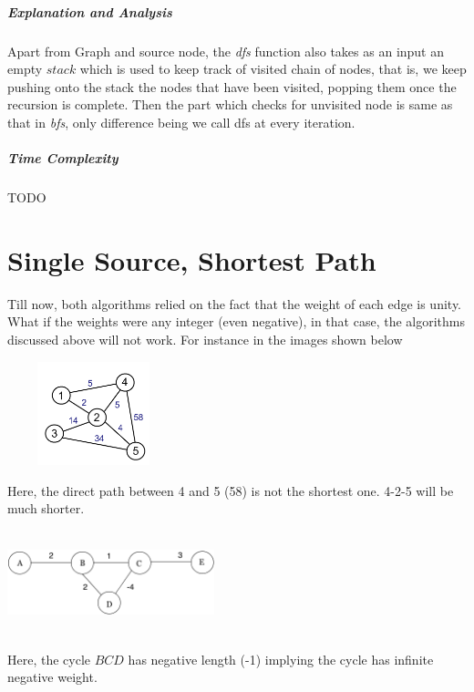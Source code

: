 \documentclass[11pt,a4paper]{extarticle}
\begin{document}
\begin{adjustwidth}{2.5em}{0pt}

\end{adjustwidth}

\subparagraph{Explanation and Analysis}
Apart from Graph and source node, the \textit{dfs} function also takes as an input an empty $stack$ which is used to keep track of visited chain of nodes, that is, we keep pushing onto the stack the nodes that have been visited, popping them once the recursion is complete. Then the part which checks for unvisited node is same as that in \textit{bfs}, only difference being we call dfs at every iteration.

\subparagraph{Time Complexity}
TODO

\section{Single Source, Shortest Path}
Till now, both algorithms relied on the fact that the weight of each edge is unity. What if the weights were any integer (even negative), in that case, the algorithms discussed above will not work. For instance in the images shown below

\begin{multicols}{2}

\begin{center}
	\includegraphics[width=5cm, height=3cm]{shortest}
\end{center}
Here, the direct path between 4 and 5 (58) is not the shortest one. 4-2-5 will be much shorter.

\columnbreak

\begin{center}
	\includegraphics[width=6cm, height=3cm]{negative}
\end{center}

Here, the cycle $BCD$ has negative length (-1) implying the cycle has infinite negative weight.

\end{multicols}
\end{document}
